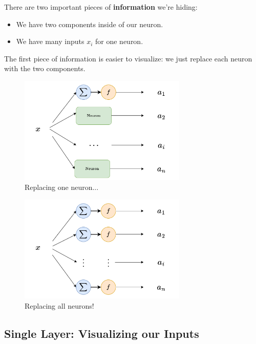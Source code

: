         There are two important pieces of \textbf{information} we're hiding:
        
        \begin{itemize}
            \item We have two components inside of our neuron.
            
            \item We have many inputs $x_i$ for one neuron.
        \end{itemize}
        
        The first piece of information is easier to visualize: we just replace each neuron with the two components.
        
        \begin{figure}[H]
            \centering
            \includegraphics[width=80mm,scale=0.4]{images/nn_images/replace_one_neuron.png}
            \caption*{Replacing one neuron...}
        \end{figure}
        
        \begin{figure}[H]
            \centering
            \includegraphics[width=80mm,scale=0.4]{images/nn_images/replace_all_neurons.png}
            \caption*{Replacing all neurons!}
        \end{figure}
    
    \subsection{Single Layer: Visualizing our Inputs}
    
